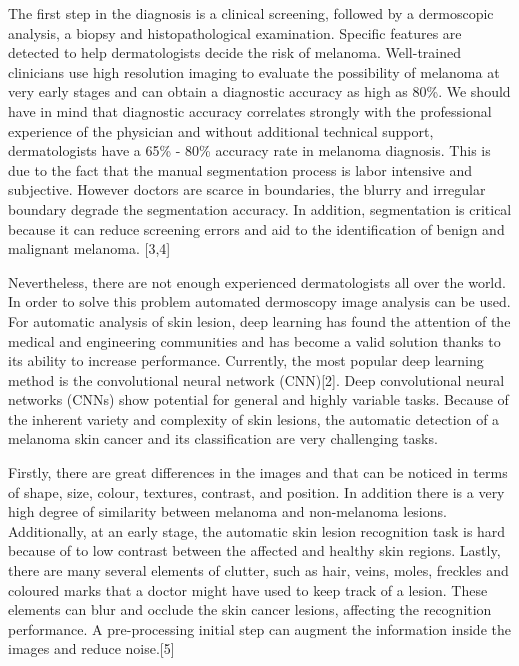 \documentclass[12pt,a4paper,oneside]{report} %
\begin{document}
The first step in the diagnosis is a clinical screening, followed by a dermoscopic analysis, a biopsy and histopathological examination.
Specific features are detected to help dermatologists decide the risk of melanoma. 
Well-trained clinicians use high resolution imaging to evaluate the possibility of melanoma at very early stages and can obtain a diagnostic accuracy as high as 80\%. 
We should have in mind that diagnostic accuracy correlates strongly with the professional experience of the physician and without additional technical support, dermatologists have a 
65\% - 80\% accuracy rate in melanoma diagnosis. 
This is due to the fact that the manual segmentation process is labor intensive and subjective. However doctors are scarce in boundaries, the blurry and irregular boundary 
degrade the segmentation accuracy. In addition, segmentation is critical because it can reduce screening errors and aid to the identification of benign and malignant melanoma. [3,4]
\newline

Nevertheless, there are not enough experienced dermatologists all over the world. In order to solve this problem automated dermoscopy image analysis can be used. For automatic 
analysis of skin lesion, deep learning has found the attention of the medical and engineering communities and has become a valid solution thanks to its ability to increase performance. Currently, the most popular deep learning method is the convolutional neural network (CNN)[2]. Deep convolutional neural networks (CNNs) show potential for general and highly variable tasks.
Because of the inherent variety and complexity of skin lesions, the automatic detection of a melanoma skin cancer and its classification are very challenging tasks.
\newline 

Firstly, there are great differences in the images and that can be noticed in 
terms of shape, size, colour, textures, contrast, and position. In addition there is a very high degree of similarity between melanoma and non-melanoma lesions. Additionally, at an early
stage, the automatic skin lesion recognition task is hard because of to low contrast between the affected and healthy skin regions. 
Lastly, there are many several elements of clutter, such as hair, veins, moles, freckles and coloured marks that a doctor might have used to keep track of a lesion. These elements can blur and occlude the skin cancer lesions, affecting the recognition performance. 
A pre-processing initial step can augment the information inside the images and reduce noise.[5]
\newline
\end{document}
